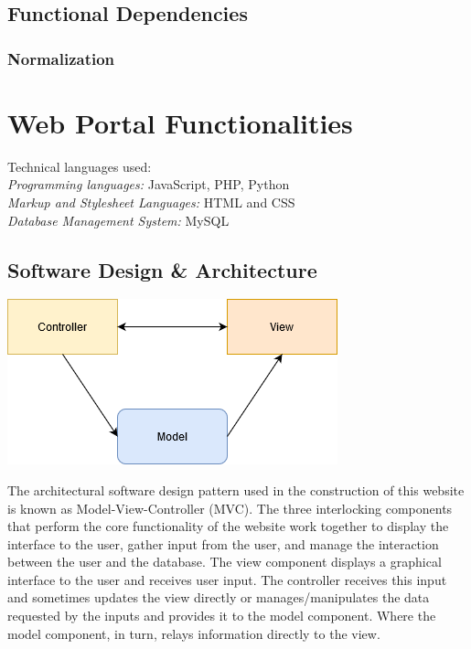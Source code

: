 \documentclass[11pt]{article}
\begin{document}
\subsection{Functional Dependencies}

\subsubsection{Normalization}

\section{Web Portal Functionalities}
Technical languages used: \\
\textit{Programming languages:} JavaScript, PHP, Python \\
\textit{Markup and Stylesheet Languages:} HTML and CSS \\
\textit{Database Management System:} MySQL

\subsection{Software Design \& Architecture}

\includegraphics[scale=.7]{MVC.png}

The architectural software design pattern used in the construction of this website is known as Model-View-Controller (MVC). The three interlocking components that perform the core functionality of the website work together to display the interface to the user, gather input from the user, and manage the interaction between the user and the database. The view component displays a graphical interface to the user and receives user input. The controller receives this input and sometimes updates the view directly or manages/manipulates the data requested by the inputs and provides it to the model component. Where the model component, in turn, relays information directly to the view.

\newpage
\end{document}
